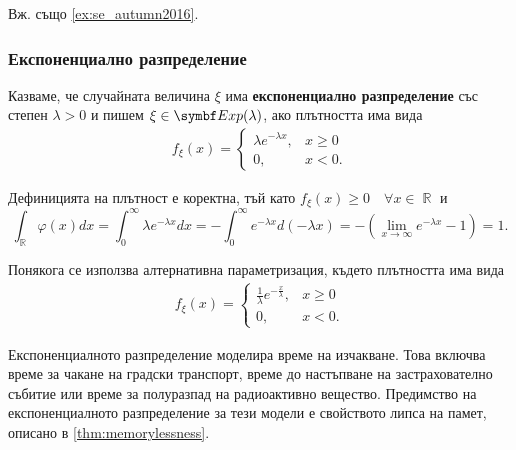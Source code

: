 \documentclass{../../common/topic}
\begin{document}
Вж. също \cref{ex:se_autumn2016}.

\subsubsection{Експоненциално разпределение}\label{sec:exp}

\begin{definition}
  Казваме, че случайната величина \( \xi \) има \textbf{експоненциално разпределение} със степен \( \lambda > 0 \) и пишем \( \xi \in \distr{Exp}(\lambda) \), ако плътността има вида
  \begin{align*}
    f_\xi(x) = \begin{cases}
      \lambda e^{-\lambda x}, & x \geq 0 \\
      0, &x < 0.
    \end{cases}
  \end{align*}

  Дефиницията на плътност е коректна, тъй като \( f_\xi(x) \geq 0\quad\forall x \in \BbbR \) и
  \begin{equation*}
    \int_{\BbbR} \varphi(x) dx
    =
    \int_0^\infty \lambda e^{-\lambda x} dx
    =
    -\int_0^\infty e^{-\lambda x} d(-\lambda x)
    =
    -(\lim_{x \to \infty} e^{-\lambda x} - 1)
    =
    1.
  \end{equation*}

  Понякога се използва алтернативна параметризация, където плътността има вида
  \begin{align*}
    f_\xi(x) = \begin{cases}
      \frac 1 \lambda e^{-\frac x \lambda}, & x \geq 0 \\
      0, &x < 0.
    \end{cases}
  \end{align*}
\end{definition}

Експоненциалното разпределение моделира време на изчакване. Това включва време за чакане на градски транспорт, време до настъпване на застрахователно събитие или време за полуразпад на радиоактивно вещество. Предимство на експоненциалното разпределение за тези модели е свойството липса на памет, описано в \cref{thm:memorylessness}.
\end{document}
